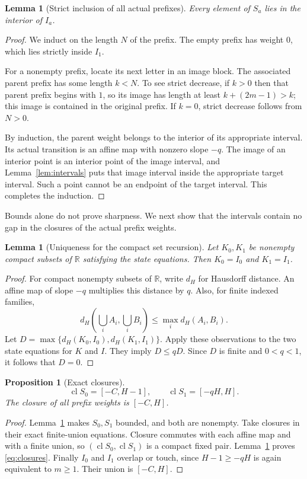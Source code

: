 \documentclass[11pt]{article}
\numberwithin{equation}{section}
\newtheorem{lemma}[theorem]{Lemma}
\newtheorem{proposition}[theorem]{Proposition}
\theoremstyle{definition}
\theoremstyle{remark}
\newcommand{\R}{\mathbb{R}}
\newcommand{\cl}{\operatorname{cl}}
\begin{document}
\begin{lemma}[Strict inclusion of all actual prefixes]\label{lem:strict}
Every element of $S_a$ lies in the interior of $I_a$.
\end{lemma}
\begin{proof}
We induct on the length $N$ of the prefix. The empty prefix has weight
$0$, which lies strictly inside $I_1$.

For a nonempty prefix, locate its next letter in an image block. The
associated parent prefix has some length $k<N$. To see strict decrease,
if $k>0$ then that parent prefix begins with $1$, so its image has length
at least $k+(2m-1)>k$; this image is contained in the original prefix.
If $k=0$, strict decrease follows from $N>0$.

By induction, the parent weight belongs to the interior of its appropriate
interval. Its actual transition is an affine map with nonzero slope
$-q$. The image of an interior point is an interior point of the image
interval, and Lemma~\ref{lem:intervals} puts that image interval inside
the appropriate target interval. Such a point cannot be an endpoint of
the target interval. This completes the induction.
\end{proof}

Bounds alone do not prove sharpness. We next show that the intervals
contain no gap in the closures of the actual prefix weights.

\begin{lemma}[Uniqueness for the compact set recursion]\label{lem:hausdorff}
Let $K_0,K_1$ be nonempty compact subsets of $\R$ satisfying the state
equations. Then $K_0=I_0$ and $K_1=I_1$.
\end{lemma}
\begin{proof}
For compact nonempty subsets of $\R$, write $d_H$ for Hausdorff distance.
An affine map of slope $-q$ multiplies this distance by $q$.
Also, for finite indexed families,
\[
d_H\left(\bigcup_i A_i,\bigcup_i B_i\right)
\le\max_i d_H(A_i,B_i).
\]
Let $D=\max\{d_H(K_0,I_0),d_H(K_1,I_1)\}$. Apply these observations to
the two state equations for $K$ and $I$. They imply $D\le qD$.
Since $D$ is finite and $0<q<1$, it follows that $D=0$.
\end{proof}

\begin{proposition}[Exact closures]\label{prop:closures}
\begin{equation}\label{eq:closures}
\cl S_0=[-C,H-1],\qquad \cl S_1=[-qH,H].
\end{equation}
The closure of all prefix weights is $[-C,H]$.
\end{proposition}
\begin{proof}
Lemma~\ref{lem:strict} makes $S_0,S_1$ bounded, and both are nonempty.
Take closures in their exact finite-union equations. Closure commutes
with each affine map and with a finite union, so $(\cl S_0,\cl S_1)$ is
a compact fixed pair. Lemma~\ref{lem:hausdorff} proves \eqref{eq:closures}.
Finally $I_0$ and $I_1$ overlap or touch, since
$H-1\ge-qH$ is again equivalent to $m\ge1$. Their union is $[-C,H]$.
\end{proof}
\end{document}
